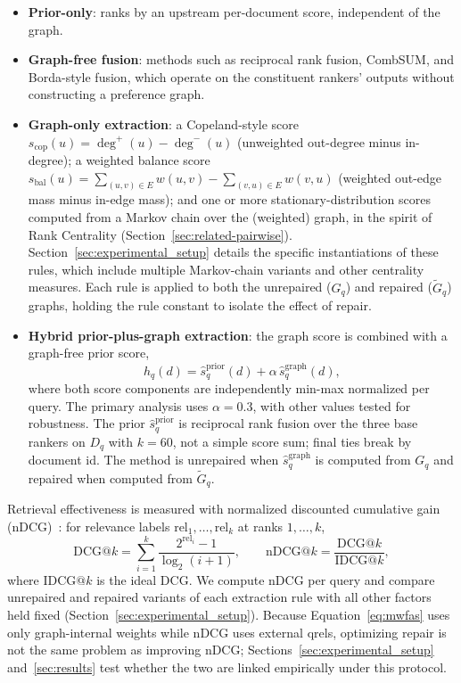 \documentclass[pdflatex,sn-basic,Numbered]{sn-jnl}
\begin{document}
\begin{itemize}
  \item \textbf{Prior-only}: ranks by an upstream per-document score,
    independent of the graph.
  \item \textbf{Graph-free fusion}: methods such as reciprocal rank fusion,
    CombSUM, and Borda-style fusion, which operate on the constituent
    rankers' outputs without constructing a preference graph.
  \item \textbf{Graph-only extraction}: a Copeland-style score
    $s_{\mathrm{cop}}(u) = \deg^+(u) - \deg^-(u)$ (unweighted
    out-degree minus in-degree); a weighted balance score
    $s_{\mathrm{bal}}(u) = \sum_{(u,v) \in E} w(u,v) - \sum_{(v,u) \in E}
    w(v,u)$ (weighted out-edge mass minus in-edge mass); and one or more
    stationary-distribution scores computed from a Markov chain over the
    (weighted) graph, in the spirit of Rank Centrality
    (Section~\ref{sec:related-pairwise}). Section~\ref{sec:experimental_setup}
    details the specific instantiations of these rules, which include
    multiple Markov-chain variants and other centrality measures. Each rule
    is applied to both the unrepaired ($G_q$) and repaired
    ($\widetilde{G}_q$) graphs, holding the rule constant to isolate the
    effect of repair.
  \item \textbf{Hybrid prior-plus-graph extraction}: the graph score is
    combined with a graph-free prior score,
    \begin{equation}
    h_q(d) = \hat{s}^{\mathrm{prior}}_q(d)
             + \alpha\, \hat{s}^{\mathrm{graph}}_q(d),
    \label{eq:hybrid}
    \end{equation}
    where both score components are independently min-max normalized per
    query. The primary analysis uses $\alpha=0.3$, with other values tested
    for robustness. The prior $\hat{s}^{\mathrm{prior}}_q$ is reciprocal
    rank fusion over the three base rankers on $D_q$ with $k{=}60$, not a
    simple score sum; final ties break by document id. The method is
    unrepaired when $\hat{s}^{\mathrm{graph}}_q$ is computed from $G_q$ and
    repaired when computed from $\widetilde{G}_q$.
\end{itemize}

Retrieval effectiveness is measured with normalized discounted cumulative
gain (nDCG)~\cite{jarvelin2002cumulated}: for relevance labels
$\mathrm{rel}_1,\dots,\mathrm{rel}_k$ at ranks $1,\dots,k$,
\begin{equation}
\mathrm{DCG}@k = \sum_{i=1}^{k} \frac{2^{\mathrm{rel}_i}-1}{\log_2(i+1)},
\qquad
\mathrm{nDCG}@k = \frac{\mathrm{DCG}@k}{\mathrm{IDCG}@k},
\label{eq:ndcg}
\end{equation}
where $\mathrm{IDCG}@k$ is the ideal DCG. We compute nDCG per query and
compare unrepaired and repaired variants of each extraction rule with all
other factors held fixed
(Section~\ref{sec:experimental_setup}). Because
Equation~\eqref{eq:mwfas} uses only graph-internal weights while nDCG uses
external qrels, optimizing repair is not the same problem as improving
nDCG; Sections~\ref{sec:experimental_setup} and~\ref{sec:results} test
whether the two are linked empirically under this protocol.
\end{document}
